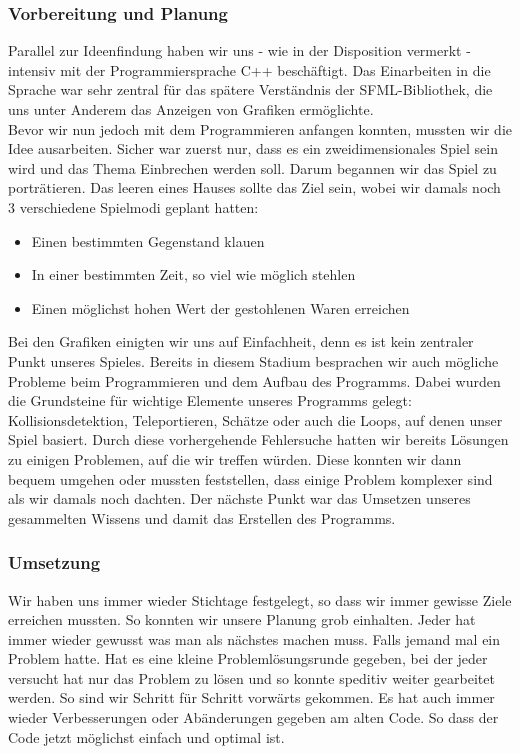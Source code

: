 \documentclass[12pt,a4paper]{scrartcl}
\begin{document}
\subsubsection{Vorbereitung und Planung}
Parallel zur Ideenfindung haben wir uns - wie in der
Disposition vermerkt - intensiv mit der Programmiersprache C++ beschäftigt. Das Einarbeiten
in die Sprache war sehr zentral für das spätere Verständnis der SFML-Bibliothek, die uns
unter Anderem das Anzeigen von Grafiken ermöglichte.
\\
Bevor wir nun jedoch mit dem Programmieren anfangen konnten, mussten wir die Idee ausarbeiten.
Sicher war zuerst nur, dass es ein zweidimensionales Spiel sein wird und das Thema Einbrechen werden soll.
Darum begannen wir das Spiel zu porträtieren. 
Das leeren eines Hauses sollte das Ziel sein, wobei wir damals noch 3 verschiedene Spielmodi geplant hatten:
\begin{itemize}
\item Einen bestimmten Gegenstand klauen
\item In einer bestimmten Zeit, so viel wie möglich stehlen
\item Einen möglichst hohen Wert der gestohlenen Waren erreichen
\end{itemize}
Bei den Grafiken einigten wir uns auf Einfachheit, denn es ist kein zentraler Punkt unseres Spieles.
Bereits in diesem Stadium besprachen wir auch mögliche Probleme beim Programmieren und dem Aufbau des Programms.
Dabei wurden die Grundsteine für wichtige Elemente unseres Programms gelegt: Kollisionsdetektion, Teleportieren, Schätze oder auch die Loops, auf denen unser Spiel basiert. 
Durch diese vorhergehende Fehlersuche hatten wir bereits Lösungen zu einigen Problemen, auf die wir treffen würden. Diese konnten wir dann bequem umgehen oder mussten feststellen, dass einige Problem komplexer sind als wir damals noch dachten.
Der nächste Punkt war das Umsetzen unseres gesammelten Wissens und damit das Erstellen des Programms.

\subsubsection{Umsetzung}
Wir haben uns immer wieder Stichtage festgelegt, so dass wir immer gewisse Ziele erreichen mussten. So konnten wir unsere Planung grob einhalten. Jeder hat immer wieder gewusst was man als nächstes machen muss. Falls jemand mal ein Problem hatte. Hat es eine kleine Problemlösungsrunde gegeben, bei der jeder versucht hat nur das Problem zu lösen und so konnte speditiv weiter gearbeitet werden. So sind wir Schritt für Schritt vorwärts gekommen. Es hat auch immer wieder Verbesserungen oder Abänderungen gegeben am alten Code. So dass der Code jetzt möglichst einfach und optimal ist. 
\end{document}
